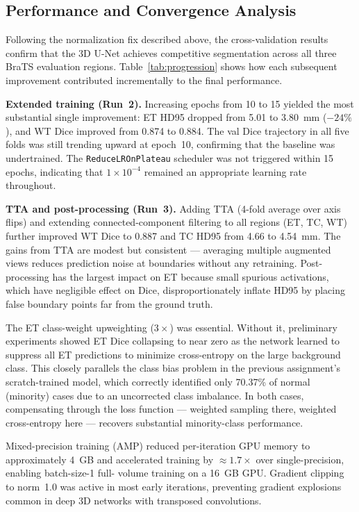 \documentclass[10pt,twocolumn]{article}
\begin{document}
\subsection{Performance and Convergence Analysis}

Following the normalization fix described above, the
cross-validation results confirm that the 3D U-Net achieves
competitive segmentation across all three BraTS evaluation
regions. Table~\ref{tab:progression} shows how each subsequent
improvement contributed incrementally to the final performance.

\textbf{Extended training (Run~2).} Increasing epochs from 10 to
15 yielded the most substantial single improvement: ET HD95
dropped from 5.01 to 3.80~mm ($-24\%$), and WT Dice improved
from 0.874 to 0.884. The val Dice trajectory in all five folds
was still trending upward at epoch~10, confirming that the
baseline was undertrained. The \texttt{ReduceLROnPlateau}
scheduler was not triggered within 15 epochs, indicating that
$1 \times 10^{-4}$ remained an appropriate learning rate
throughout.

\textbf{TTA and post-processing (Run~3).} Adding TTA (4-fold
average over axis flips) and extending connected-component
filtering to all regions (ET, TC, WT) further improved WT Dice
to 0.887 and TC HD95 from 4.66 to 4.54~mm. The gains from TTA
are modest but consistent --- averaging multiple augmented views
reduces prediction noise at boundaries without any retraining.
Post-processing has the largest impact on ET because small
spurious activations, which have negligible effect on Dice,
disproportionately inflate HD95 by placing false boundary points
far from the ground truth.

The ET class-weight upweighting ($3\times$) was essential.
Without it, preliminary experiments showed ET Dice collapsing to
near zero as the network learned to suppress all ET predictions
to minimize cross-entropy on the large background class. This
closely parallels the class bias problem in the previous
assignment's scratch-trained model, which correctly identified
only 70.37\% of normal (minority) cases due to an uncorrected
class imbalance. In both cases, compensating through the loss
function --- weighted sampling there, weighted cross-entropy here
--- recovers substantial minority-class performance.

Mixed-precision training (AMP) reduced per-iteration GPU memory
to approximately 4~GB and accelerated training by $\approx
1.7\times$ over single-precision, enabling batch-size-1 full-
volume training on a 16~GB GPU. Gradient clipping to norm~1.0
was active in most early iterations, preventing gradient
explosions common in deep 3D networks with transposed
convolutions.
\end{document}
